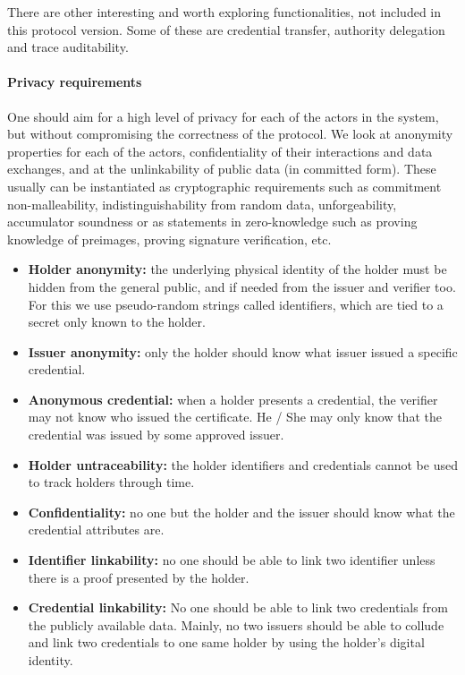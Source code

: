 There are other interesting and worth exploring functionalities, not included in this protocol version. 
Some of these are credential transfer, authority delegation and trace auditability.


\paragraph{Privacy requirements}
One should aim for a high level of privacy for each of the actors in the system, but without compromising the correctness of the protocol.
We look at anonymity properties for each of the actors, confidentiality of their interactions and data exchanges, and at the unlinkability of public data (in committed form).
These usually can be instantiated as cryptographic requirements such as commitment non-malleability, indistinguishability from random data, unforgeability, accumulator soundness or as statements in zero-knowledge such as proving knowledge of preimages, proving signature verification, etc.

\begin{itemize}
	\item \textbf{Holder anonymity:} the underlying physical identity of the holder must be hidden from the general public, and if needed from the issuer and verifier too. 
	For this we use pseudo-random strings called identifiers, which are tied to a secret only known to the holder. 
	
	\item \textbf{Issuer anonymity:} only the holder should know what issuer issued a specific credential.
	
	\item \textbf{Anonymous credential:} when a holder presents a credential, the verifier may not know who issued the certificate. He / She may only know that the credential was issued by some approved issuer.
	
	\item \textbf{Holder untraceability:} the holder identifiers and credentials cannot be used to track holders through time.
	
	\item \textbf{Confidentiality:} no one but the holder and the issuer should know what the credential attributes are.
	
	\item \textbf{Identifier linkability:} no one should be able to link two identifier unless there is a proof presented by the holder.
	
	\item \textbf{Credential linkability:} No one should be able to link two credentials from the publicly available data. Mainly, no two issuers should be able to collude and link two credentials to one same holder by using the holder's digital identity.
\end{itemize}


